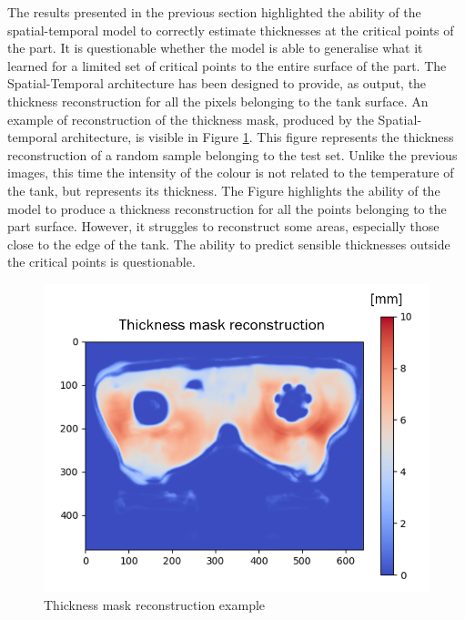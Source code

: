 
The results presented in the previous section highlighted the ability of the spatial-temporal model to correctly estimate thicknesses at the critical points of the part.  It is questionable whether the model is able to generalise what it learned for a limited set of critical points to the entire surface of the part. The Spatial-Temporal architecture has been designed to provide, as output, the thickness reconstruction for all the pixels belonging to the tank surface. An example of reconstruction of the thickness mask, produced by the Spatial-temporal architecture, is visible in Figure \ref{fig:thickness_mask_reconstruction}. This figure represents the thickness reconstruction of a random sample belonging to the test set. Unlike the previous images, this time the intensity of the colour is not related to the temperature of the tank, but represents its thickness.
The Figure highlights the ability of the model to produce a thickness reconstruction for all the points belonging to the part surface. However, it struggles to reconstruct some areas, especially those close to the edge of the tank. The ability to predict sensible thicknesses outside the critical points is questionable.

\begin{figure}
\centering
\includegraphics[scale=0.90]{images/chapter_4/mask_reconstruction.png}
\caption{Thickness mask reconstruction example}
\label{fig:thickness_mask_reconstruction}
\end{figure}

